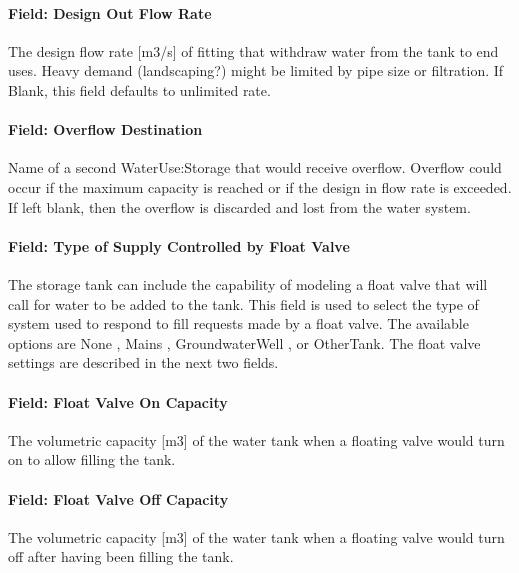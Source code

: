 \paragraph{Field: Design Out Flow Rate}\label{field-design-out-flow-rate}

The design flow rate {[}m3/s{]} of fitting that withdraw water from the tank to end uses. Heavy demand (landscaping?) might be limited by pipe size or filtration. If Blank, this field defaults to unlimited rate.

\paragraph{Field: Overflow Destination}\label{field-overflow-destination}

Name of a second WaterUse:Storage that would receive overflow. Overflow could occur if the maximum capacity is reached or if the design in flow rate is exceeded. If left blank, then the overflow is discarded and lost from the water system.

\paragraph{Field: Type of Supply Controlled by Float Valve}\label{field-type-of-supply-controlled-by-float-valve}

The storage tank can include the capability of modeling a float valve that will call for water to be added to the tank. This field is used to select the type of system used to respond to fill requests made by a float valve. The available options are None , Mains , GroundwaterWell , or OtherTank. The float valve settings are described in the next two fields.

\paragraph{Field: Float Valve On Capacity}\label{field-float-valve-on-capacity}

The volumetric capacity {[}m3{]} of the water tank when a floating valve would turn on to allow filling the tank.

\paragraph{Field: Float Valve Off Capacity}\label{field-float-valve-off-capacity}

The volumetric capacity {[}m3{]} of the water tank when a floating valve would turn off after having been filling the tank.

